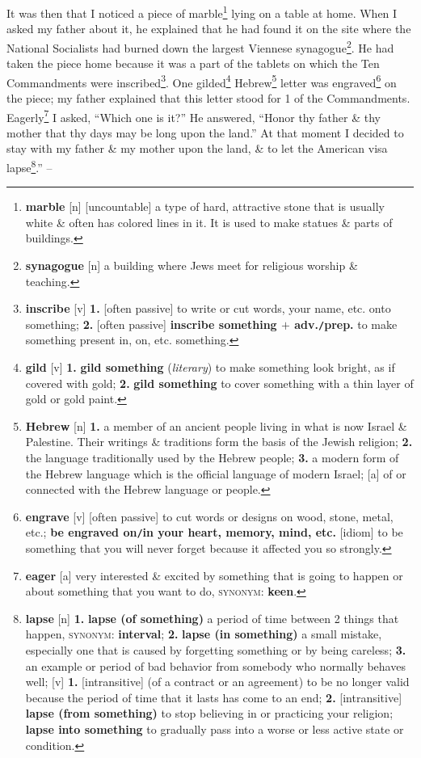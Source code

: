 \documentclass[oneside]{book}
\numberwithin{equation}{section}
\begin{document}
It was then that I noticed a piece of marble\footnote{\textbf{marble} [n] [uncountable] a type of hard, attractive stone that is usually white \& often has colored lines in it. It is used to make statues \& parts of buildings.} lying on a table at home. When I asked my father about it, he explained that he had found it on the site where the National Socialists had burned down the largest Viennese synagogue\footnote{\textbf{synagogue} [n] a building where Jews meet for religious worship \& teaching.}. He had taken the piece home because it was a part of the tablets on which the Ten Commandments were inscribed\footnote{\textbf{inscribe} [v] \textbf{1.} [often passive] to write or cut words, your name, etc. onto something; \textbf{2.} [often passive] \textbf{inscribe something $+$ adv.\texttt{/}prep.} to make something present in, on, etc. something.}. One gilded\footnote{\textbf{gild} [v] \textbf{1.} \textbf{gild something} (\textit{literary}) to make something look bright, as if covered with gold; \textbf{2.} \textbf{gild something} to cover something with a thin layer of gold or gold paint.} Hebrew\footnote{\textbf{Hebrew} [n] \textbf{1.} a member of an ancient people living in what is now Israel \& Palestine. Their writings \& traditions form the basis of the Jewish religion; \textbf{2.} the language traditionally used by the Hebrew people; \textbf{3.} a modern form of the Hebrew language which is the official language of modern Israel; [a] of or connected with the Hebrew language or people.} letter was engraved\footnote{\textbf{engrave} [v] [often passive] to cut words or designs on wood, stone, metal, etc.; \textbf{be engraved on\texttt{/}in your heart, memory, mind, etc.} [idiom] to be something that you will never forget because it affected you so strongly.} on the piece; my father explained that this letter stood for 1 of the Commandments. Eagerly\footnote{\textbf{eager} [a] very interested \& excited by something that is going to happen or about something that you want to do, \textsc{synonym}: \textbf{keen}.} I asked, ``Which one is it?'' He answered, ``Honor thy father \& thy mother that thy days may be long upon the land.'' At that moment I decided to stay with my father \& my mother upon the land, \& to let the American visa lapse\footnote{\textbf{lapse} [n] \textbf{1.} \textbf{lapse (of something)} a period of time between 2 things that happen, \textsc{synonym}: \textbf{interval}; \textbf{2.} \textbf{lapse (in something)} a small mistake, especially one that is caused by forgetting something or by being careless; \textbf{3.} an example or period of bad behavior from somebody who normally behaves well; [v] \textbf{1.} [intransitive] (of a contract or an agreement) to be no longer valid because the period of time that it lasts has come to an end; \textbf{2.} [intransitive] \textbf{lapse (from something)} to stop believing in or practicing your religion; \textbf{lapse into something} to gradually pass into a worse or less active state or condition.}.'' -- \cite[pp. 12--13]{Frankl2013}
\end{document}
